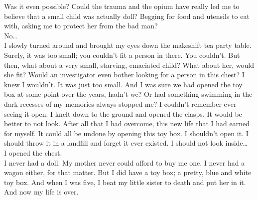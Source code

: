 \documentclass[a5paper]{scrartcl}
\begin{document}
Was it even possible? Could the trauma and the opium have really led me to believe that a small child was actually doll? Begging for food and utensils to eat with, asking me to protect her from the bad man?\\

No\dots \\

I slowly turned around and brought my eyes down the makeshift tea party table. Surely, it was too small; you couldn't fit a person in there. You couldn't. But then, what about a very small, starving, emaciated child? What about her, would she fit? Would an investigator even bother looking for a person in this chest? I knew I wouldn't. It was just too small. And I was sure we had opened the toy box at some point over the years, hadn't we? Or had something swimming in the dark recesses of my memories always stopped me? I couldn't remember ever seeing it open.
I knelt down to the ground and opened the clasps. It would be better to not look. After all that I had overcome, this new life that I had earned for myself. It could all be undone by opening this toy box. I shouldn't open it. I should throw it in a landfill and forget it ever existed. I should not look inside\dots \\

I opened the chest.\\

I never had a doll. My mother never could afford to buy me one. I never had a wagon either, for that matter. But I did have a toy box; a pretty, blue and white toy box. And when I was five, I beat my little sister to death and put her in it. And now my life is over.\\
\end{document}
